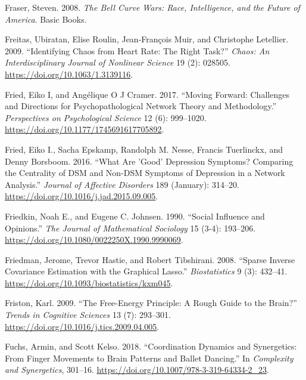 \documentclass[
  a4paper,
  DIV=11,
  numbers=noendperiod]{scrreprt}
\newlength{\cslhangindent}
\newlength{\cslentryspacingunit} %
\newenvironment{CSLReferences}[2] %
 {%
  \setlength{\parindent}{0pt}
  \ifodd #1
  \let\oldpar\par
  \def\par{\hangindent=\cslhangindent\oldpar}
  \fi
  \setlength{\parskip}{#2\cslentryspacingunit}
 }%
 {}
\begin{document}
\begin{CSLReferences}{1}{0}
\leavevmode{}%
Fraser, Steven. 2008. \emph{The {Bell Curve Wars}: {Race},
{Intelligence}, and the {Future} of {America}}. {Basic Books}.

\leavevmode{}%
Freitas, Ubiratan, Elise Roulin, Jean-François Muir, and Christophe
Letellier. 2009. {``Identifying Chaos from Heart Rate: {The} Right
Task?''} \emph{Chaos: An Interdisciplinary Journal of Nonlinear Science}
19 (2): 028505. \url{https://doi.org/10.1063/1.3139116}.

\leavevmode{}%
Fried, Eiko I, and Angélique O J Cramer. 2017. {``Moving {Forward}:
{Challenges} and {Directions} for {Psychopathological Network Theory}
and {Methodology}.''} \emph{Perspectives on Psychological Science} 12
(6): 999--1020. \url{https://doi.org/10.1177/1745691617705892}.

\leavevmode{}%
Fried, Eiko I., Sacha Epskamp, Randolph M. Nesse, Francis Tuerlinckx,
and Denny Borsboom. 2016. {``What Are 'Good' Depression Symptoms?
{Comparing} the Centrality of {DSM} and Non-{DSM} Symptoms of Depression
in a Network Analysis.''} \emph{Journal of Affective Disorders} 189
(January): 314--20. \url{https://doi.org/10.1016/j.jad.2015.09.005}.

\leavevmode{}%
Friedkin, Noah E., and Eugene C. Johnsen. 1990. {``Social Influence and
Opinions.''} \emph{The Journal of Mathematical Sociology} 15 (3-4):
193--206. \url{https://doi.org/10.1080/0022250X.1990.9990069}.

\leavevmode{}%
Friedman, Jerome, Trevor Hastie, and Robert Tibshirani. 2008. {``Sparse
Inverse Covariance Estimation with the Graphical Lasso.''}
\emph{Biostatistics} 9 (3): 432--41.
\url{https://doi.org/10.1093/biostatistics/kxm045}.

\leavevmode{}%
Friston, Karl. 2009. {``The Free-Energy Principle: A Rough Guide to the
Brain?''} \emph{Trends in Cognitive Sciences} 13 (7): 293--301.
\url{https://doi.org/10.1016/j.tics.2009.04.005}.

\leavevmode{}%
Fuchs, Armin, and Scott Kelso. 2018. {``Coordination {Dynamics} and
{Synergetics}: {From Finger Movements} to {Brain Patterns} and {Ballet
Dancing}.''} In \emph{Complexity and {Synergetics}}, 301--16.
\url{https://doi.org/10.1007/978-3-319-64334-2_23}.


\end{CSLReferences}
\end{document}
